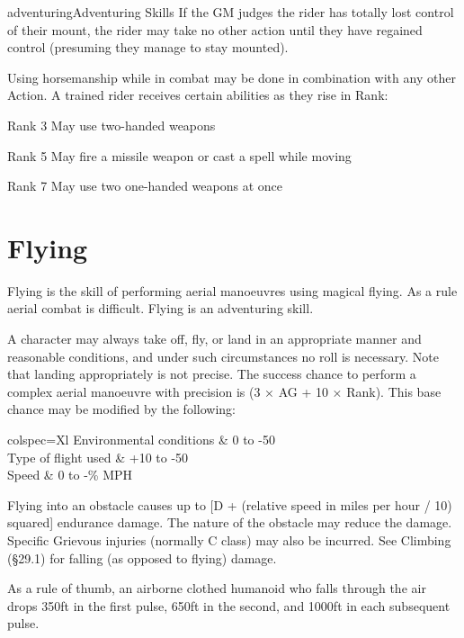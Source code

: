 \begin{Skill}[1.2]{adventuring}{Adventuring Skills}
If the GM judges the rider has totally lost control of their mount,
the rider may take no other action until they have regained control
(presuming they manage to stay mounted).

Using horsemanship while in combat may be done in combination with any
other Action.  A trained rider receives certain abilities as they rise
in Rank:

\begin{Description}

\item[Rank 3] May use two-handed weapons
  
\item [Rank 5]May fire a missile weapon or cast a spell while moving

\item [Rank 7] May use two one-handed weapons at once

\end{Description}

\section{Flying}

Flying is the skill of performing aerial manoeuvres using magical
flying.  As a rule aerial combat is difficult. Flying is an
adventuring skill.

A character may always take off, fly, or land in an appropriate manner
and reasonable conditions, and under such circumstances no roll is
necessary. Note that landing appropriately is not precise.  The
success chance to perform a complex aerial manoeuvre with precision is
(3 × AG + 10 × Rank).  This base chance may be modified by the
following:

\begin{dqtblr}{colspec={Xl}}
Environmental conditions	& 0 to -50 \\
Type of flight used		& +10 to -50 \\
Speed				& 0 to -\% MPH \\
\end{dqtblr}

Flying into an obstacle causes up to [D + (relative speed in miles per
  hour / 10) squared] endurance damage. The nature of the obstacle may
reduce the damage.  Specific Grievous injuries (normally C class) may
also be incurred.  See Climbing (§29.1) for falling (as opposed to
flying) damage.

As a rule of thumb, an airborne clothed humanoid who falls through the
air drops 350ft in the first pulse, 650ft in the second, and 1000ft in
each subsequent pulse.


\end{Skill}
